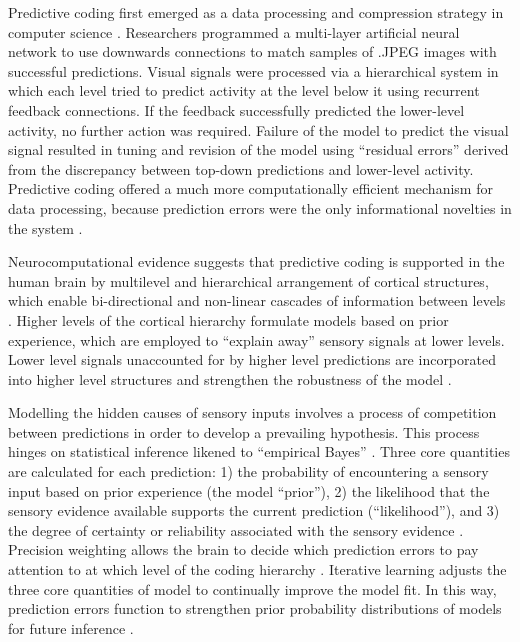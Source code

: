 \begin{CJK}{UTF8}{gbsn}
Predictive coding first emerged as a data processing and compression strategy in computer science \citep{Rao1999}.  Researchers programmed a multi-layer artificial neural network to use downwards connections to match samples of .JPEG images with successful predictions. Visual signals were processed via a hierarchical system in which each level tried to predict activity at the level below it using recurrent feedback connections. If the feedback successfully predicted the lower-level activity, no further action was required. Failure of the model to predict the visual signal resulted in tuning and revision of the model using ``residual errors'' derived from the discrepancy between top-down predictions and lower-level activity.  Predictive coding offered a much more computationally efficient mechanism for data processing, because prediction errors were the only informational novelties in the system \citep{Clark2015}.

Neurocomputational evidence suggests that predictive coding is supported in the human brain by multilevel and hierarchical arrangement of cortical structures, which enable bi-directional and non-linear cascades of information between levels \citep{Feldman2010}.  Higher levels of the cortical hierarchy formulate models based on prior experience, which are employed to ``explain away'' sensory signals at lower levels.  Lower level signals unaccounted for by higher level predictions are incorporated into higher level structures and strengthen the robustness of the model \citep{Clark2013}.

Modelling the hidden causes of sensory inputs involves a process of competition between predictions in order to develop a prevailing hypothesis. This process hinges on statistical inference likened to ``empirical Bayes'' \citep{Clark2013}.  Three core quantities are calculated for each prediction: 1) the probability of encountering a sensory input based on prior experience (the model ``prior''), 2) the likelihood that the sensory evidence available supports the current prediction (``likelihood''), and 3) the degree of certainty or reliability associated with the sensory evidence \citep[which is proportional to the inverse variance of the model prior for each sensory input][]{Ernst2004,Clark2013}. Precision weighting allows the brain to decide which prediction errors to pay attention to at which level of the coding hierarchy \citep[be it high and conceptual or deep and sensory][]{Friston2015}.  Iterative learning adjusts the three core quantities of model to continually improve the model fit.  In this way, prediction errors function to strengthen prior probability distributions of models for future inference \citep{Robbins1964}.


\end{CJK}
